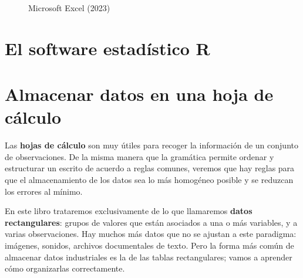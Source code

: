 \documentclass[
  letterpaper,
  DIV=11,
  numbers=noendperiod,
  oneside]{scrreprt}
\begin{document}
\begin{figure}
\begin{minipage}[t]{0.50\linewidth}
{}

\end{minipage}%
\newline
\begin{minipage}[t]{\linewidth}

{\centering 


\caption{Microsoft Excel (2023)}

}

\end{minipage}%

\end{figure}

\hypertarget{el-software-estaduxedstico-r}{%
\section{El software estadístico R}\label{el-software-estaduxedstico-r}}

\hypertarget{almacenar-datos-en-una-hoja-de-cuxe1lculo}{%
\section{Almacenar datos en una hoja de
cálculo}\label{almacenar-datos-en-una-hoja-de-cuxe1lculo}}

Las \textbf{hojas de cálculo} son muy útiles para recoger la información
de un conjunto de observaciones. De la misma manera que la gramática
permite ordenar y estructurar un escrito de acuerdo a reglas comunes,
veremos que hay reglas para que el almacenamiento de los datos sea lo
más homogéneo posible y se reduzcan los errores al mínimo.

En este libro trataremos exclusivamente de lo que llamaremos
\textbf{datos rectangulares}: grupos de valores que están asociados a
una o más variables, y a varias observaciones. Hay muchos más datos que
no se ajustan a este paradigma: imágenes, sonidos, archivos documentales
de texto. Pero la forma más común de almacenar datos industriales es la
de las tablas rectangulares; vamos a aprender cómo organizarlas
correctamente.
\end{document}
